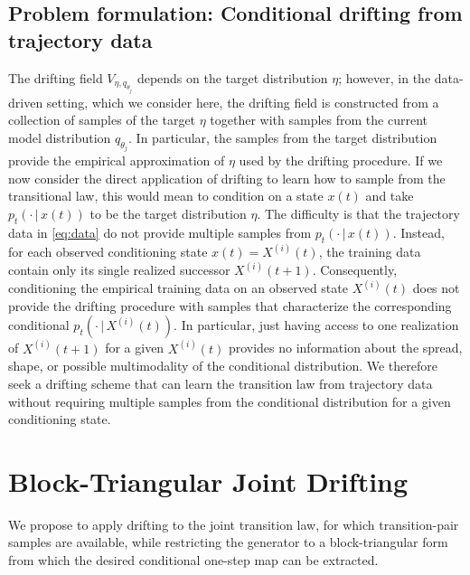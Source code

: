 \documentclass[oneside,11pt]{article}
\theoremstyle{remark}
\begin{document}
\subsection{Problem formulation: Conditional drifting from trajectory data}
The drifting field $V_{\eta,q_{\theta_j}}$ depends on the target distribution
$\eta$; however, in the data-driven setting, which we consider here, 
the drifting field is constructed from a collection of samples of the target $\eta$ together with samples from the current model
distribution $q_{\theta_j}$. 
In particular, the samples from the target distribution provide the empirical approximation of
$\eta$ used by the drifting procedure.
If we now consider the direct application
of drifting to learn how to sample from the transitional law, this would mean to condition on a state $x(t)$ and take $p_t(\cdot\,|\,x(t))$ to be the target distribution $\eta$.  
The difficulty is that the trajectory data in \eqref{eq:data} do not provide multiple samples from $p_t(\cdot \,|\, x(t))$. Instead, for each observed conditioning state $ x(t) = X^{(i)}(t)$, the training data contain only its single realized successor $X^{(i)}(t+1)$.
Consequently, conditioning the empirical training data on an observed
state $X^{(i)}(t)$ does not provide the drifting procedure with samples that
characterize the corresponding  conditional
$p_t(\cdot\,|\,X^{(i)}(t))$. In particular, just having access to one realization of $X^{(i)}(t + 1)$ for a given $X^{(i)}(t)$
provides no information about the spread, shape, or possible multimodality
of the conditional distribution.
We therefore seek a drifting scheme that can learn the transition law from trajectory data without requiring multiple  samples from the conditional distribution for a given conditioning state.




\section{Block-Triangular Joint Drifting}
We propose to apply drifting to the joint transition law, for which transition-pair samples are available, while restricting the generator to a block-triangular form from which the desired conditional one-step map can be extracted. 
\end{document}
